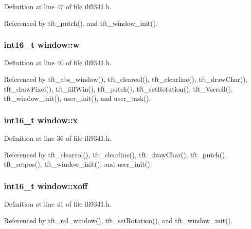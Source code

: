 Definition at line 47 of file ili9341.\-h.



Referenced by tft\-\_\-putch(), and tft\-\_\-window\-\_\-init().

\hypertarget{structwindow_ad89fdeb11ce94e2e7501f7290372d6ae}{
\subsubsection[{w}]{\setlength{\rightskip}{0pt plus 5cm}int16\-\_\-t window\-::w}}\label{structwindow_ad89fdeb11ce94e2e7501f7290372d6ae}


Definition at line 40 of file ili9341.\-h.



Referenced by tft\-\_\-abs\-\_\-window(), tft\-\_\-cleareol(), tft\-\_\-clearline(), tft\-\_\-draw\-Char(), tft\-\_\-draw\-Pixel(), tft\-\_\-fill\-Win(), tft\-\_\-putch(), tft\-\_\-set\-Rotation(), tft\-\_\-\-Vscroll(), tft\-\_\-window\-\_\-init(), user\-\_\-init(), and user\-\_\-task().

\hypertarget{structwindow_a879b99940dfc34772f0257f54c67b817}{
\subsubsection[{x}]{\setlength{\rightskip}{0pt plus 5cm}int16\-\_\-t window\-::x}}\label{structwindow_a879b99940dfc34772f0257f54c67b817}


Definition at line 36 of file ili9341.\-h.



Referenced by tft\-\_\-cleareol(), tft\-\_\-clearline(), tft\-\_\-draw\-Char(), tft\-\_\-putch(), tft\-\_\-setpos(), tft\-\_\-window\-\_\-init(), and user\-\_\-init().

\hypertarget{structwindow_a12d0408f393bc8d23cc3f1ce46c39879}{
\subsubsection[{xoff}]{\setlength{\rightskip}{0pt plus 5cm}int16\-\_\-t window\-::xoff}}\label{structwindow_a12d0408f393bc8d23cc3f1ce46c39879}


Definition at line 41 of file ili9341.\-h.



Referenced by tft\-\_\-rel\-\_\-window(), tft\-\_\-set\-Rotation(), and tft\-\_\-window\-\_\-init().

